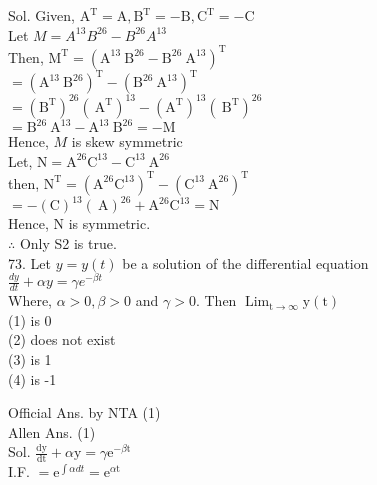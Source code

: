 \documentclass[10pt]{article}
\begin{document}
Sol. Given, \(\mathrm{A}^{\mathrm{T}}=\mathrm{A}, \mathrm{B}^{\mathrm{T}}=-\mathrm{B}, \mathrm{C}^{\mathrm{T}}=-\mathrm{C}\)\\
Let \(M=A^{13} B^{26}-B^{26} A^{13}\)\\
Then, \(\mathrm{M}^{\mathrm{T}}=\left(\mathrm{A}^{13} \mathrm{~B}^{26}-\mathrm{B}^{26} \mathrm{~A}^{13}\right)^{\mathrm{T}}\)\\
\(=\left(\mathrm{A}^{13} \mathrm{~B}^{26}\right)^{\mathrm{T}}-\left(\mathrm{B}^{26} \mathrm{~A}^{13}\right)^{\mathrm{T}}\)\\
\(=\left(\mathrm{B}^{\mathrm{T}}\right)^{26}\left(\mathrm{~A}^{\mathrm{T}}\right)^{13}-\left(\mathrm{A}^{\mathrm{T}}\right)^{13}\left(\mathrm{~B}^{\mathrm{T}}\right)^{26}\)\\
\(=\mathrm{B}^{26} \mathrm{~A}^{13}-\mathrm{A}^{13} \mathrm{~B}^{26}=-\mathrm{M}\)\\
Hence, \(M\) is skew symmetric\\
Let, \(\mathrm{N}=\mathrm{A}^{26} \mathrm{C}^{13}-\mathrm{C}^{13} \mathrm{~A}^{26}\)\\
then, \(\mathrm{N}^{\mathrm{T}}=\left(\mathrm{A}^{26} \mathrm{C}^{13}\right)^{\mathrm{T}}-\left(\mathrm{C}^{13} \mathrm{~A}^{26}\right)^{\mathrm{T}}\)\\
\(=-(\mathrm{C})^{13}(\mathrm{~A})^{26}+\mathrm{A}^{26} \mathrm{C}^{13}=\mathrm{N}\)\\
Hence, N is symmetric.\\
\(\therefore\) Only S2 is true.\\
73. Let \(y=y(t)\) be a solution of the differential equation\\
\(\frac{d y}{d t}+\alpha y=\gamma e^{-\beta t}\)\\
Where, \(\alpha>0, \beta>0\) and \(\gamma>0\). Then \(\operatorname{Lim}_{\mathrm{t} \rightarrow \infty} \mathrm{y}(\mathrm{t})\)\\
(1) is 0\\
(2) does not exist\\
(3) is 1\\
(4) is -1

Official Ans. by NTA (1)\\
Allen Ans. (1)\\
Sol. \(\frac{\mathrm{dy}}{\mathrm{dt}}+\alpha \mathrm{y}=\gamma \mathrm{e}^{-\beta \mathrm{t}}\)\\
I.F. \(=\mathrm{e}^{\int \alpha d t}=\mathrm{e}^{\alpha \mathrm{t}}\)
\end{document}
